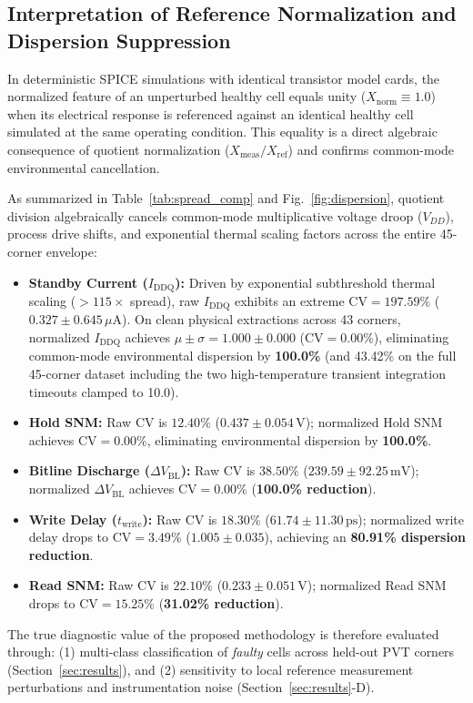 \documentclass[conference]{IEEEtran}
\begin{document}
\subsection{Interpretation of Reference Normalization and Dispersion Suppression}
In deterministic SPICE simulations with identical transistor model cards, the normalized feature of an unperturbed healthy cell equals unity ($X_{\text{norm}} \equiv 1.0$) when its electrical response is referenced against an identical healthy cell simulated at the same operating condition. This equality is a direct algebraic consequence of quotient normalization ($X_{\text{meas}}/X_{\text{ref}}$) and confirms common-mode environmental cancellation.

As summarized in Table~\ref{tab:spread_comp} and Fig.~\ref{fig:dispersion}, quotient division algebraically cancels common-mode multiplicative voltage droop ($V_{DD}$), process drive shifts, and exponential thermal scaling factors across the entire 45-corner envelope:
\begin{itemize}
    \item \textbf{Standby Current ($I_{\text{DDQ}}$):} Driven by exponential subthreshold thermal scaling ($>115\times$ spread), raw $I_{\text{DDQ}}$ exhibits an extreme $\text{CV} = 197.59\%$ ($0.327 \pm 0.645\,\mu\text{A}$). On clean physical extractions across 43 corners, normalized $I_{\text{DDQ}}$ achieves $\mu \pm \sigma = 1.000 \pm 0.000$ ($\text{CV} = \mathbf{0.00\%}$), eliminating common-mode environmental dispersion by \textbf{100.0\%} (and 43.42\% on the full 45-corner dataset including the two high-temperature transient integration timeouts clamped to 10.0).
    \item \textbf{Hold SNM:} Raw CV is $12.40\%$ ($0.437 \pm 0.054\,\text{V}$); normalized Hold SNM achieves $\text{CV} = \mathbf{0.00\%}$, eliminating environmental dispersion by \textbf{100.0\%}.
    \item \textbf{Bitline Discharge ($\Delta V_{\text{BL}}$):} Raw CV is $38.50\%$ ($239.59 \pm 92.25\,\text{mV}$); normalized $\Delta V_{\text{BL}}$ achieves $\text{CV} = \mathbf{0.00\%}$ (\textbf{100.0\% reduction}).
    \item \textbf{Write Delay ($t_{\text{write}}$):} Raw CV is $18.30\%$ ($61.74 \pm 11.30\,\text{ps}$); normalized write delay drops to $\text{CV} = \mathbf{3.49\%}$ ($1.005 \pm 0.035$), achieving an \textbf{80.91\% dispersion reduction}.
    \item \textbf{Read SNM:} Raw CV is $22.10\%$ ($0.233 \pm 0.051\,\text{V}$); normalized Read SNM drops to $\text{CV} = \mathbf{15.25\%}$ (\textbf{31.02\% reduction}).
\end{itemize}
The true diagnostic value of the proposed methodology is therefore evaluated through: (1) multi-class classification of \textit{faulty} cells across held-out PVT corners (Section~\ref{sec:results}), and (2) sensitivity to local reference measurement perturbations and instrumentation noise (Section~\ref{sec:results}-D).
\end{document}
